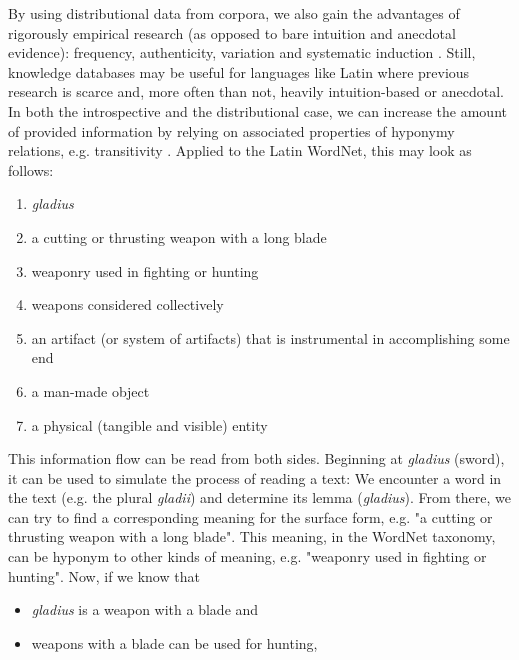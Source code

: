 \documentclass[runningheads]{llncs}
\begin{document}
By using distributional data from corpora, we also gain the advantages of rigorously empirical research (as opposed to bare intuition and anecdotal evidence): frequency, authenticity, variation and systematic induction \parencite[60]{griesBehavioralProfilesCorpusbased2009}. Still, knowledge databases may be useful for languages like Latin where previous research is scarce and, more often than not, heavily intuition-based or anecdotal. In both the introspective and the distributional case, we can increase the amount of provided information by relying on associated properties of hyponymy relations, e.g. transitivity \parencite[58]{coenenAnalogieUndMetapher2013}. Applied to the Latin WordNet, this may look as follows:
\begin{enumerate}
         \item \textit{gladius}
         \item a cutting or thrusting weapon with a long blade
         \item weaponry used in fighting or hunting
         \item weapons considered collectively
         \item an artifact (or system of artifacts) that is instrumental in accomplishing some end
         \item a man-made object
         \item a physical (tangible and visible) entity
\end{enumerate}
This information flow can be read from both sides. Beginning at \textit{gladius} (sword), it can be used to simulate the process of reading a text: We encounter a word in the text (e.g. the plural \textit{gladii}) and determine its lemma (\textit{gladius}). From there, we can try to find a corresponding meaning for the surface form, e.g. "a cutting or thrusting weapon with a long blade". This meaning, in the WordNet taxonomy, can be hyponym to other kinds of meaning, e.g. "weaponry used in fighting or hunting". Now, if we know that
\begin{itemize}
         \item \textit{gladius} is a weapon with a blade and
         \item weapons with a blade can be used for hunting,
\end{itemize}
\end{document}
